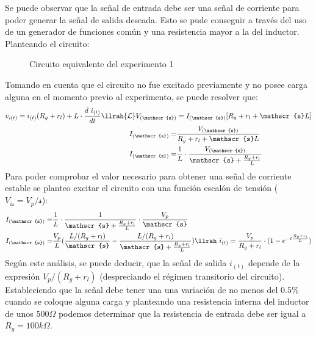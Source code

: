 Se puede observar que la señal de entrada debe ser una señal de corriente para poder generar la señal de salida deseada. Esto se pude conseguir a través del uso de un generador de funciones común y una resistencia mayor a la del inductor. Planteando el circuito:
\begin{figure}[H]
    \centering
    
    \caption{Circuito equivalente del experimento 1}
    \label{fig:CircExp1}
\end{figure}
Tomando en cuenta que el circuito no fue excitado previamente y no posee carga alguna en el momento previo al experimento, se puede resolver que:
\begin{equation}
    \begin{aligned}
            v_{i(t)}=i_{(t)}(R_g+r_l)+L\cdot\frac{d~i_{(t)}}{dt}\llrah{\mathcal{L}} V_{(\mathscr{s})}&=I_{(\mathscr{s})}[R_g+r_l+\mathscr{s}L]\\
            I_{(\mathscr{s})}=&\frac{V_{(\mathscr{s})}}{R_g+r_l+\mathscr{s}L}\\
            I_{(\mathscr{s})}=&\frac{1}{L}\cdot\frac{V_{(\mathscr{s})}}{\mathscr{s}+\frac{R_g+r_l}{L}}\\
    \end{aligned}
\end{equation}
Para poder comprobar el valor necesario para obtener una señal de corriente estable se planteo excitar el circuito con una función escalón de tensión ($V_{i\mathscr{s}}=V_p/\mathscr{s}$):
\begin{equation}\label{eq:finepx3}
    \begin{aligned}
            I_{(\mathscr{s})}=&\frac{1}{L}\cdot\frac{1}{\mathscr{s}+\frac{R_g+r_l}{L}}\cdot \frac{V_p}{\mathscr{s}}\\
            I_{(\mathscr{s})}=&\frac{V_p}{L}(\frac{L/(R_g+r_l)}{\mathscr{s}}-\frac{L/(R_g+r_l)}{\mathscr{s}+\frac{R_g+r_l}{L}})\llrah ~i_{(t)}=\frac{V_p}{R_g+r_l}\cdot(1-e^{-t\frac{R_g+r_l}{L}})
    \end{aligned}
\end{equation}
Según este análisis, se puede deducir, que la señal de salida $i_{(t)}$ depende de la expresión $V_p/(R_g+r_l)$ (despreciando el régimen transitorio del circuito). Estableciendo que la señal debe tener una una variación de no menos del $0.5\%$ cuando se coloque alguna carga y planteando una resistencia interna del inductor de unos $500\Omega$ podemos determinar que la resistencia de entrada debe ser igual a $R_g=100k\Omega$.

